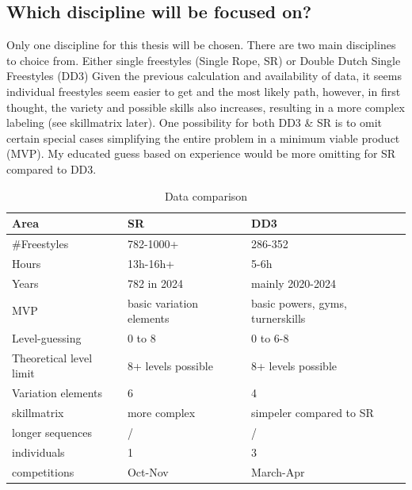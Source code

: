 
\subsection{Which discipline will be focused on?}

Only one discipline for this thesis will be chosen.
There are two main disciplines to choice from. Either single freestyles (Single Rope, SR) or Double Dutch Single Freestyles (DD3)
Given the previous calculation and availability of data, it seems individual freestyles seem easier to get and the most likely path, however, in first thought, the variety and possible skills also increases, resulting in a more complex labeling (see skillmatrix later). One possibility for both DD3 \& SR is to omit certain special cases simplifying the entire problem in a minimum viable product (MVP). My educated guess based on experience would be more omitting for SR compared to DD3.


\begin{table}[t]
    \centering
    \begin{tabular}{|l|l|l|}
        \hline
        Area & SR & DD3 \\ \hline
        \#Freestyles & 782-1000+ & 286-352 \\ \hline
        Hours & 13h-16h+ & 5-6h \\ \hline
        Years & 782 in 2024 & mainly 2020-2024 \\ \hline
        MVP & basic variation elements & basic powers, gyms, turnerskills \\ \hline
        Level-guessing & 0 to 8 & 0 to 6-8 \\ \hline
        Theoretical level limit & 8+ levels possible & 8+ levels possible \\ \hline
        Variation elements & 6 & 4 \\ \hline
        skillmatrix & more complex & simpeler compared to SR \\ \hline
        longer sequences & / & / \\ \hline
        individuals & 1 & 3 \\ \hline
        competitions & Oct-Nov & March-Apr \\ \hline
    \end{tabular}
    \caption{Data comparison}
\end{table}

